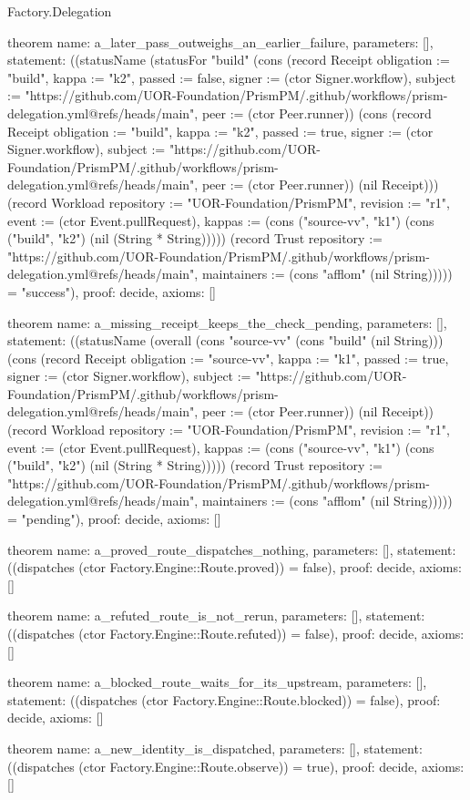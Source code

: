 \begin{lexlean}{Factory.Delegation}
\begin{semanticmodule}
theorem{
  name: a_later_pass_outweighs_an_earlier_failure,
  parameters: [],
  statement: ((statusName (statusFor "build" (cons (record Receipt {obligation := "build", kappa := "k2", passed := false, signer := (ctor Signer.workflow), subject := "https://github.com/UOR-Foundation/PrismPM/.github/workflows/prism-delegation.yml@refs/heads/main", peer := (ctor Peer.runner)}) (cons (record Receipt {obligation := "build", kappa := "k2", passed := true, signer := (ctor Signer.workflow), subject := "https://github.com/UOR-Foundation/PrismPM/.github/workflows/prism-delegation.yml@refs/heads/main", peer := (ctor Peer.runner)}) (nil Receipt))) (record Workload {repository := "UOR-Foundation/PrismPM", revision := "r1", event := (ctor Event.pullRequest), kappas := (cons ("source-vv", "k1") (cons ("build", "k2") (nil (String * String))))}) (record Trust {repository := "https://github.com/UOR-Foundation/PrismPM/.github/workflows/prism-delegation.yml@refs/heads/main", maintainers := (cons "afflom" (nil String))}))) = "success"),
  proof: decide{},
  axioms: []
}

theorem{
  name: a_missing_receipt_keeps_the_check_pending,
  parameters: [],
  statement: ((statusName (overall (cons "source-vv" (cons "build" (nil String))) (cons (record Receipt {obligation := "source-vv", kappa := "k1", passed := true, signer := (ctor Signer.workflow), subject := "https://github.com/UOR-Foundation/PrismPM/.github/workflows/prism-delegation.yml@refs/heads/main", peer := (ctor Peer.runner)}) (nil Receipt)) (record Workload {repository := "UOR-Foundation/PrismPM", revision := "r1", event := (ctor Event.pullRequest), kappas := (cons ("source-vv", "k1") (cons ("build", "k2") (nil (String * String))))}) (record Trust {repository := "https://github.com/UOR-Foundation/PrismPM/.github/workflows/prism-delegation.yml@refs/heads/main", maintainers := (cons "afflom" (nil String))}))) = "pending"),
  proof: decide{},
  axioms: []
}

theorem{
  name: a_proved_route_dispatches_nothing,
  parameters: [],
  statement: ((dispatches (ctor Factory.Engine::Route.proved)) = false),
  proof: decide{},
  axioms: []
}

theorem{
  name: a_refuted_route_is_not_rerun,
  parameters: [],
  statement: ((dispatches (ctor Factory.Engine::Route.refuted)) = false),
  proof: decide{},
  axioms: []
}

theorem{
  name: a_blocked_route_waits_for_its_upstream,
  parameters: [],
  statement: ((dispatches (ctor Factory.Engine::Route.blocked)) = false),
  proof: decide{},
  axioms: []
}

theorem{
  name: a_new_identity_is_dispatched,
  parameters: [],
  statement: ((dispatches (ctor Factory.Engine::Route.observe)) = true),
  proof: decide{},
  axioms: []
}
\end{semanticmodule}
\end{lexlean}

